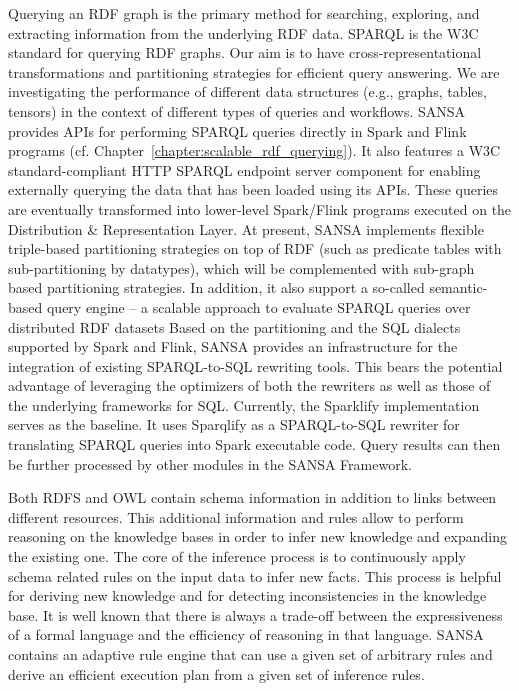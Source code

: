 Querying an \gls{RDF} graph is the primary method for searching, exploring, and extracting information from the underlying \gls{RDF} data.
\gls{SPARQL} is the \gls{W3C} standard for querying \gls{RDF} graphs.
Our aim is to have cross-representational transformations and partitioning strategies for efficient query answering. We are investigating the performance of different data structures (e.g., graphs, tables, tensors) in the context of different types of queries and workflows.
SANSA provides \gls{API}s for performing \gls{SPARQL} queries directly in Spark and Flink programs (cf. Chapter~\ref{chapter:scalable_rdf_querying}).
It also features a \gls{W3C} standard-compliant HTTP \gls{SPARQL} endpoint server component for enabling externally querying the data that has been loaded using its \gls{API}s.
These queries are eventually transformed into lower-level Spark/Flink programs executed on the Distribution \& Representation Layer.
At present, SANSA implements flexible triple-based partitioning strategies on top of \gls{RDF} (such as predicate tables with sub-partitioning by datatypes), which will be complemented with sub-graph based partitioning strategies.
In addition, it also support a so-called semantic-based query engine -- a scalable approach to evaluate \gls{SPARQL} queries over distributed \gls{RDF} datasets
Based on the partitioning and the SQL dialects supported by Spark and Flink, SANSA provides an infrastructure for the integration of existing SPARQL-to-SQL rewriting tools. 
This bears the potential advantage of leveraging the optimizers of both the rewriters as well as those of the underlying frameworks for SQL.
Currently, the Sparklify implementation serves as the baseline.
It uses Sparqlify as a SPARQL-to-SQL rewriter for translating \gls{SPARQL} queries into Spark executable code.
Query results can then be further processed by other modules in the SANSA Framework.

Both \gls{RDFS} and \gls{OWL} contain schema information in addition to links between different resources. 
This additional information and rules allow to perform reasoning on the knowledge bases in order to infer new knowledge and expanding the existing one. 
The core of the inference process is to continuously apply schema related rules on the input data to infer new facts. 
This process is helpful for deriving new knowledge and for detecting inconsistencies in the knowledge base.
It is well known that there is always a trade-off between the expressiveness of a formal language and the efficiency of reasoning in that language. 
SANSA contains an adaptive rule engine that can use a given set of arbitrary rules and derive an efficient execution plan from a given set of inference rules.

